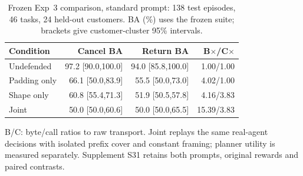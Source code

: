 \begin{table}[t]\centering\footnotesize\setlength{\tabcolsep}{3pt}
\caption{Frozen Exp~3 comparison, standard prompt: 138 test episodes, 46 tasks, 24 held-out customers. BA (\%) uses the frozen suite; brackets give customer-cluster 95\% intervals.}\label{tab:r4-primary}
\begin{tabularx}{\columnwidth}{@{}Yrrr@{}}\toprule
Condition & Cancel BA & Return BA & B$\times$/C$\times$\\\midrule
Undefended & 97.2 [90.0,100.0] & 94.0 [85.8,100.0] & 1.00/1.00\\
Padding only & 66.1 [50.0,83.9] & 55.5 [50.0,73.0] & 4.02/1.00\\
Shape only & 60.8 [55.4,71.3] & 51.9 [50.5,57.8] & 4.16/3.83\\
Joint & 50.0 [50.0,60.6] & 50.0 [50.0,65.5] & 15.39/3.83\\\bottomrule
\end{tabularx}
\par\smallskip\raggedright B/C: byte/call ratios to raw transport. Joint replays the same real-agent decisions with isolated prefix cover and constant framing; planner utility is measured separately. Supplement S31 retains both prompts, original rewards and paired contrasts.
\end{table}

